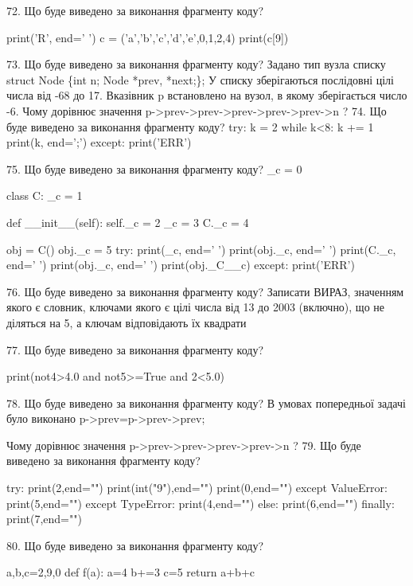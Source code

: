 \documentclass[11pt]{article}
\begin{document}
72. Що буде виведено за виконання фрагменту коду?

print('R', end=' ')
c = ('a','b','c','d','e',0,1,2,4)
print(c[9])


73. Що буде виведено за виконання фрагменту коду?
Задано тип вузла списку
struct Node \{int n; Node *prev, *next;\};
У списку зберігаються послідовні цілі числа від -68 до 17. Вказівник p встановлено на вузол, в якому зберігається число -6.
Чому дорівнює значення p->prev->prev->prev->prev->prev->n ?
74. Що буде виведено за виконання фрагменту коду?
try:
    k = 2
    while k<8:
        k += 1
    print(k, end=';')
except:
    print('ERR')

75. Що буде виведено за виконання фрагменту коду?
_c = 0

class C:
    _c = 1
    
    def __init__(self):
        self._c = 2
        _c = 3
        C._c = 4

obj = C()
obj._c = 5
try:
    print(_c, end=' ')
    print(obj._c, end=' ')
    print(C._c, end=' ')
    print(obj._c, end=' ')
    print(obj._C__c)
except:
    print('ERR')

76. Що буде виведено за виконання фрагменту коду?
Записати ВИРАЗ, значенням якого є словник, ключами якого є цілі числа від 13 до 2003 (включно), що не діляться на 5, а ключам відповідають їх квадрати 

77. Що буде виведено за виконання фрагменту коду?

print(not4>4.0 and not5>=True and 2<5.0)

78. Що буде виведено за виконання фрагменту коду?
В умовах попередньої задачі було виконано p->prev=p->prev->prev;

Чому дорівнює значення p->prev->prev->prev->prev->n ?
79. Що буде виведено за виконання фрагменту коду?

try:
    print(2,end="")
    print(int("9"),end="")
    print(0,end="")
except ValueError: print(5,end="")
except TypeError: print(4,end="")
else: print(6,end="")
finally: print(7,end="")


80. Що буде виведено за виконання фрагменту коду?

a,b,c=2,9,0
def f(a):
    a=4
    b+=3
    c=5
    return a+b+c
\end{document}
